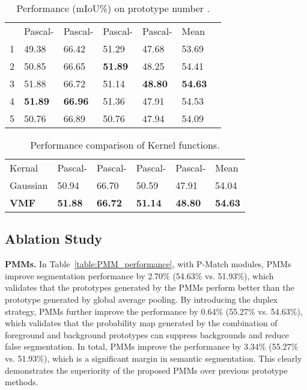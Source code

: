 \documentclass[runningheads]{llncs}
\begin{document}
\setlength{\tabcolsep}{4pt}
\begin{table}[t]
\begin{center}
\caption{Performance (mIoU\%) on prototype number .}
\label{table:k}
\begin{tabular}{lllllll}
\hline\noalign{\smallskip}
 & Pascal- & Pascal- & Pascal- & Pascal- & Mean \\
\noalign{\smallskip}
\hline
\noalign{\smallskip}
1& 49.38 & 66.42 & 51.29 & 47.68 & 53.69\\
 2& 50.85 & 66.65 & \bf51.89 & 48.25 & 54.41\\
 3& 51.88 & 66.72 & 51.14 & \bf48.80 & \bf54.63\\
 4& \bf51.89 &\bf 66.96 & 51.36 & 47.91 & 54.53\\
 5& 50.76 & 66.89 & 50.76 & 47.94 & 54.09\\
\hline
\end{tabular}
\end{center}
\end{table}
\setlength{\tabcolsep}{1.4pt}

\setlength{\tabcolsep}{4pt}
\begin{table}
\begin{center}
\caption{Performance comparison of Kernel functions.}
\label{table:kernel}
\begin{tabular}{llllll}
\hline\noalign{\smallskip}
Kernal & Pascal- & Pascal- & Pascal- & Pascal- & Mean \\
\noalign{\smallskip}
\hline
\noalign{\smallskip}
 Gaussian & 50.94 & 66.70 & 50.59 & 47.91 & 54.04 \\
 {\bf VMF} & {\bf 51.88} & {\bf 66.72} & {\bf 51.14} & {\bf 48.80} & {\bf 54.63}\\
 \hline
\end{tabular}
\end{center}
\end{table}
\setlength{\tabcolsep}{1.4pt}

\subsection{Ablation Study} 


\textbf{PMMs.}
In Table\ \ref{table:PMM_performance}, with P-Match modules, PMMs improve segmentation performance by 2.70\% (54.63\% vs. 51.93\%), which validates that the prototypes generated by the PMMs perform better than the prototype generated by global average pooling.
By introducing the duplex strategy, PMMs further improve the performance by 0.64\% (55.27\% vs. 54.63\%),  which validates that the probability map generated by the combination of foreground and background prototypes can suppress backgrounds and reduce false segmentation.
In total, PMMs improve the performance by 3.34\% (55.27\% vs. 51.93\%), which is a significant margin in semantic segmentation. This clearly demonstrates the superiority of the proposed PMMs over previous prototype methods. 
\end{document}
